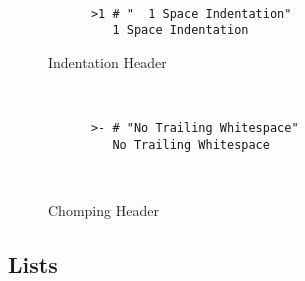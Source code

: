 \documentclass[a4paper, svgnames, 12pt]{article}
\begin{document}
\begin{figure}[H]
  \begin{minipage}[t]{0.48\textwidth}
    \vspace{0pt}
    \begin{bchart}[max=9, width=0.85\textwidth]
    \end{bchart}
  \end{minipage}
  \begin{minipage}[t]{0pt}~\end{minipage}
  \begin{minipage}[t]{0.48\textwidth}
    \vspace{0pt}
    \begin{verbatim}
      >1 # "  1 Space Indentation"
         1 Space Indentation
    \end{verbatim}
  \end{minipage}
  \caption{Indentation Header}
\end{figure}

\begin{figure}[H]
  \begin{minipage}[t]{0.48\textwidth}
    \vspace{0pt}
    \begin{bchart}[max=9, width=0.85\textwidth]
    \end{bchart}
  \end{minipage}
  \begin{minipage}[t]{0pt}~\end{minipage}
  \begin{minipage}[t]{0.48\textwidth}
    \vspace{0pt}
    \begin{verbatim}
      >- # "No Trailing Whitespace"
         No Trailing Whitespace
         󠀠
         󠀠
    \end{verbatim}
  \end{minipage}
  \caption{Chomping Header}
\end{figure}

\subsection{Lists}
\end{document}
